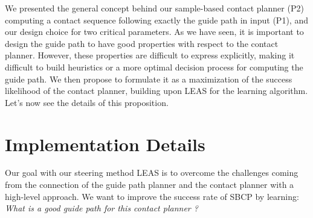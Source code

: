 We presented the general concept behind our sample-based contact planner (P2) computing a contact sequence following exactly the guide path in input (P1), and our design choice for two critical parameters.
As we have seen, it is important to design the guide path to have good properties with respect to the contact planner. 
However, these properties are difficult to express explicitly, making it difficult to build heuristics or a more optimal decision process for computing the guide path. 
We then propose to formulate it as a maximization of the success likelihood of the contact planner, building upon LEAS for the learning algorithm. Let's now see the details of this proposition.


\section{Implementation Details\label{sub:cp-sb:leas_coupling}}

Our goal with our steering method LEAS is to overcome the challenges coming from the connection of the guide path planner and the contact planner with a high-level approach.
We want to improve the success rate of SBCP by learning: \textit{What is a good guide path for this contact planner ?} 

